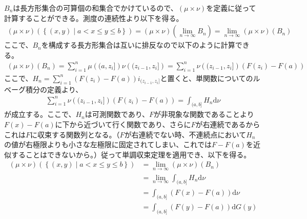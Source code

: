 \documentclass{article}
\begin{document}
$B_n$は長方形集合の可算個の和集合でかけているので、$(\mu \times \nu)$を定義に従って計算することができる。測度の連続性より以下を得る。
\begin{align*}
	(\mu \times \nu)\left( \left\{ (x, y) \mid a < x \leq y \leq b \right\} \right) = (\mu \times \nu) \left( \lim_{n\to \infty} B_n \right) = \lim_{n \to \infty} (\mu \times \nu)\left( B_n \right)
\end{align*}
ここで、$B_n$を構成する長方形集合は互いに排反なので以下のように計算できる。
\begin{align*}
	(\mu \times \nu)\left( B_n \right) = \sum_{i = 1}^n \mu \left( (a, z_i] \right) \nu \left( (z_{i-1},z_i] \right) = \sum_{i = 1}^n \nu \left( (z_{i-1},z_i] \right) \left( F(z_i) - F(a) \right)
\end{align*}
ここで、$H_n = \sum_{i = 1}^n \left( F(z_i) - F(a) \right) i_{(z_{i-1}, z_i]}$と置くと、単関数についてのルベーグ積分の定義より、
\begin{align*}
	\sum_{i = 1}^n \nu \left( (z_{i-1},z_i] \right) \left( F(z_i) - F(a) \right) = \int_{(a, b]} H_n \mathrm{d}\nu
\end{align*}
が成立する。ここで、$H_n$は可測関数であり、$F$が非現象な関数であることより$F(x) - F(a)$に下から近づいて行く関数であり、さらに$F$が右連続であるからこれは$F$に収束する関数列となる。（$F$が右連続でない時、不連続点において$H_n$の値が右極限よりも小さな左極限に固定されてしまい、これでは$F - F(a)$を近似することはできないから。）従って単調収束定理を適用でき、以下を得る。
\begin{align*}
	(\mu \times \nu)\left( \left\{ (x, y) \mid a < x \leq y \leq b \right\} \right) &= \lim_{n \to \infty} (\mu \times \nu)\left( B_n \right)\\
	&=  \lim_{n \to \infty} \int_{(a, b]} H_n \mathrm{d}\nu\\
	&= \int_{(a,b]}(F(x) - F(a)) \mathrm{d}\nu\\
	&= \int_{(a, b]} (F(y) - F(a)) \mathrm{d}G(y)
\end{align*}
\end{document}
